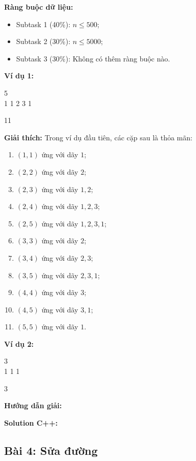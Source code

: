 \documentclass[12pt]{scrartcl}  %
\begin{document}
\textbf{Ràng buộc dữ liệu:}
\begin{itemize}
    \item Subtask 1 (40\%): $n \leq 500$;
    \item Subtask 2 (30\%): $n \leq 5000$;
    \item Subtask 3 (30\%): Không có thêm ràng buộc nào.
\end{itemize}

\textbf{Ví dụ 1:}
\begin{tcolorbox}[colback=gray!5!white, colframe=blue!50!black, title=Input]
5\\
1 1 2 3 1
\end{tcolorbox}
\begin{tcolorbox}[colback=gray!5!white, colframe=green!50!black, title=Output]
11
\end{tcolorbox}

\textbf{Giải thích:}
Trong ví dụ đầu tiên, các cặp sau là thỏa mãn:

\begin{enumerate}
\item $(1, 1)$ ứng với dãy $1$;
\item $(2, 2)$ ứng với dãy $2$;
\item $(2, 3)$ ứng với dãy $1, 2$;
\item $(2, 4)$ ứng với dãy $1, 2, 3$;
\item $(2, 5)$ ứng với dãy $1, 2, 3, 1$;
\item $(3, 3)$ ứng với dãy $2$;
\item $(3, 4)$ ứng với dãy $2, 3$;
\item $(3, 5)$ ứng với dãy $2, 3, 1$;
\item $(4, 4)$ ứng với dãy $3$;
\item $(4, 5)$ ứng với dãy $3, 1$;
\item $(5, 5)$ ứng với dãy $1$.
\end{enumerate}

\textbf{Ví dụ 2:}
\begin{tcolorbox}[colback=gray!5!white, colframe=blue!50!black, title=Input]
3\\
1 1 1
\end{tcolorbox}
\begin{tcolorbox}[colback=gray!5!white, colframe=green!50!black, title=Output]
3
\end{tcolorbox}

\textbf{Hướng dẫn giải:}

\textbf{Solution C++:}

\subsection{Bài 4: Sửa đường}
\end{document}
